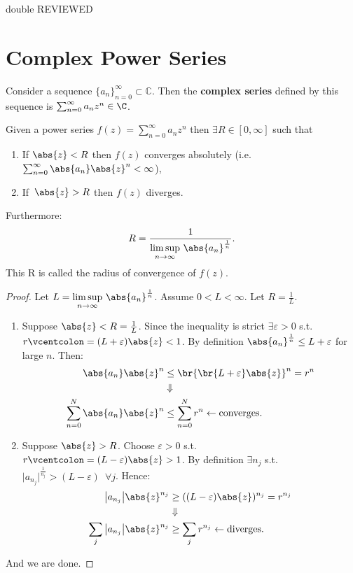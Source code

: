 \setcounter{section}{0}
\setcounter{theorem}{0}
double REVIEWED

\section{Complex Power Series}

\begin{definition}
Consider a sequence $\{a_n\}_{n=0}^\infty \subset \mathbb{C}$. Then the \textbf{complex series} defined by this sequence is $\sum_{n=0}^\infty a_nz^n \in \C$.
\end{definition}

\begin{proposition}
Given a power series $f(z)=\sum_{n=0}^\infty a_nz^n$ then $\exists R \in [0,\infty]$ such that
\begin{enumerate}
    \item If $\abs{z}<R$ then $f(z)$ converges absolutely (i.e. $\sum_{n=0}^\infty \abs{a_n}\abs{z}^n < \infty$),
    \item If $\,\abs{z}>R$ then $f(z)$ diverges.
\end{enumerate}
Furthermore:
\begin{align*}
    R=\frac{1}{\limsup\limits_{n\rightarrow \infty} \, \abs{a_n}^\frac{1}{n}}.
\end{align*}
This R is called the radius of convergence of $f(z)$.
\end{proposition}

\begin{proof}
Let $L=\limsup\limits_{n\rightarrow \infty} \, \abs{a_n}^\frac{1}{n}$. Assume $0<L<\infty$. Let $R=\frac{1}{L}$.
\begin{enumerate}
    \item Suppose $\abs{z}<R=\frac{1}{L}$. Since the inequality is strict $\exists \varepsilon>0$ s.t. $r\vcentcolon=(L+\varepsilon)\abs{z}<1$. By definition $\abs{a_n}^\frac{1}{n}\leq L+\varepsilon$ for large $n$. Then:
    \begin{align*}
        \abs{a_n} \abs{z}^n &\leq \br{\br{L+\varepsilon}\abs{z}}^n = r^n\\
        &\Downarrow\\
        \sum_{n=0}^N \abs{a_n}\abs{z}^n &\leq \sum_{n=0}^N r^n \leftarrow \text{converges}.
    \end{align*}
    \item Suppose $\abs{z}>R$. Choose $\varepsilon>0$ s.t. $r\vcentcolon=(L-\varepsilon)\abs{z}>1$. By definition $\exists n_j$ s.t. $\big|a_{n_j}\big|^\frac{1}{n_j}> (L-\varepsilon) \,\,\, \forall j$. Hence: 
    \begin{align*}
        \big|a_{n_j}\big|\abs{z}^{n_j} &\geq ((L-\varepsilon)\abs{z})^{n_j} = r^{n_j}\\
        &\Downarrow\\
        \sum_j \big|a_{n_j}\big|\abs{z}^{n_j} &\geq \sum_j r^{n_j} \leftarrow \text{diverges}.
    \end{align*}
\end{enumerate}
And we are done.
\end{proof}


